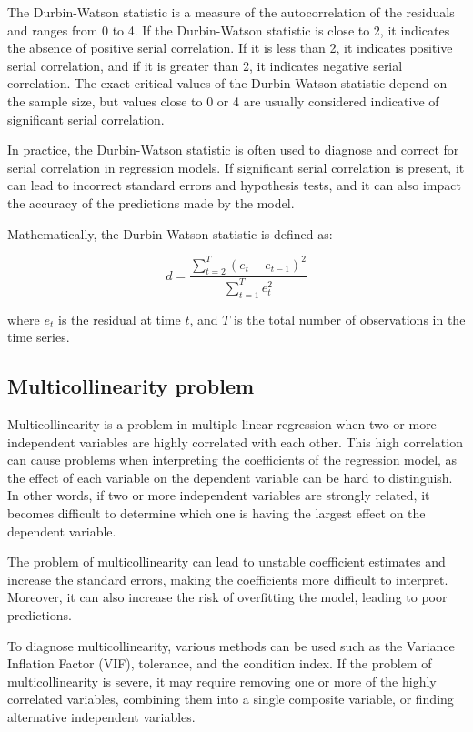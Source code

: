 \documentclass[12pt, a4paper, oneside]{article}
\begin{document}
The Durbin-Watson statistic is a measure of the autocorrelation of the residuals and ranges from 0 to 4. If the Durbin-Watson statistic is close to 2, it indicates the absence of positive serial correlation. If it is less than 2, it indicates positive serial correlation, and if it is greater than 2, it indicates negative serial correlation. The exact critical values of the Durbin-Watson statistic depend on the sample size, but values close to 0 or 4 are usually considered indicative of significant serial correlation.

In practice, the Durbin-Watson statistic is often used to diagnose and correct for serial correlation in regression models. If significant serial correlation is present, it can lead to incorrect standard errors and hypothesis tests, and it can also impact the accuracy of the predictions made by the model.

Mathematically, the Durbin-Watson statistic is defined as:

$$d = \frac{\sum_{t=2}^T (e_t - e_{t-1})^2}{\sum_{t=1}^T e_t^2}$$

where $e_t$ is the residual at time $t$, and $T$ is the total number of observations in the time series.



\subsection{ Multicollinearity problem }
Multicollinearity is a problem in multiple linear regression when two or more independent variables are highly correlated with each other. This high correlation can cause problems when interpreting the coefficients of the regression model, as the effect of each variable on the dependent variable can be hard to distinguish. In other words, if two or more independent variables are strongly related, it becomes difficult to determine which one is having the largest effect on the dependent variable.

The problem of multicollinearity can lead to unstable coefficient estimates and increase the standard errors, making the coefficients more difficult to interpret. Moreover, it can also increase the risk of overfitting the model, leading to poor predictions.

To diagnose multicollinearity, various methods can be used such as the Variance Inflation Factor (VIF), tolerance, and the condition index. If the problem of multicollinearity is severe, it may require removing one or more of the highly correlated variables, combining them into a single composite variable, or finding alternative independent variables.
\end{document}
